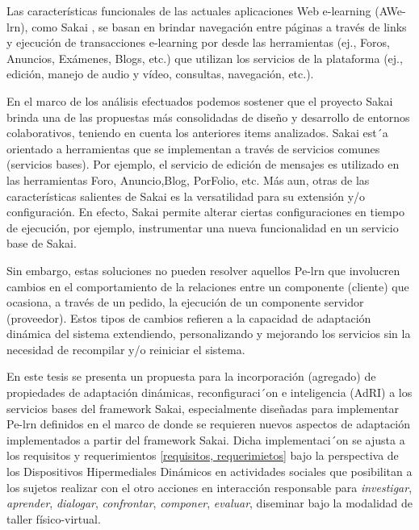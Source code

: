Las características funcionales de las actuales aplicaciones Web e-learning
(AWe-lrn), como Sakai \cite{sakai}, se basan en brindar navegación entre
páginas a través de links y ejecución de transacciones e-learning por desde las
herramientas (ej., Foros, Anuncios, Exámenes, Blogs, etc.) que utilizan los
servicios de la plataforma (ej., edición, manejo de audio y vídeo, consultas,
navegación, etc.).


En el marco de los análisis efectuados podemos sostener que el proyecto Sakai
brinda una de las propuestas más consolidadas de diseño y desarrollo de
entornos colaborativos, teniendo en cuenta los anteriores items analizados.
Sakai est´a orientado a herramientas que se implementan a través de servicios
comunes (servicios bases). Por ejemplo, el servicio de edición de mensajes es
utilizado en las herramientas Foro, Anuncio,Blog, PorFolio, etc. Más aun, otras
de las características salientes de Sakai es la versatilidad para su extensión
y/o configuración. En efecto, Sakai permite alterar ciertas configuraciones  en
tiempo de ejecución, por ejemplo, instrumentar una nueva funcionalidad en un
servicio base de Sakai.


Sin embargo, estas soluciones no pueden resolver aquellos Pe-lrn que involucren
cambios en el comportamiento de la relaciones entre un componente (cliente) que
ocasiona, a través de un pedido, la ejecución de un componente servidor
(proveedor). Estos tipos de cambios refieren a la capacidad de adaptación
dinámica del sistema \cite{cacic2007.14} extendiendo, personalizando y
mejorando los servicios sin la necesidad de recompilar y/o reiniciar el
sistema. 


En este tesis se presenta un propuesta para la incorporación (agregado) de
propiedades  de adaptación dinámicas, reconfiguraci´on e inteligencia
(AdRI) \label{AdRI} a los servicios bases del framework Sakai,
especialmente diseñadas para implementar Pe-lrn definidos en el marco de
\cite{cacic2007.9} donde se requieren nuevos aspectos de adaptación
\cite{cacic2007.1} implementados a partir del framework Sakai. Dicha
implementaci´on se ajusta a los requisitos y requerimientos \ref{requisitos,
requerimietos} bajo la perspectiva de los Dispositivos Hipermediales Dinámicos
en actividades sociales que posibilitan a los sujetos realizar con el otro
acciones en interacción responsable para \textit{investigar}, \textit{aprender},
\textit{dialogar}, \textit{confrontar}, \textit{componer}, \textit{evaluar},
diseminar bajo la modalidad de taller físico-virtual.  

